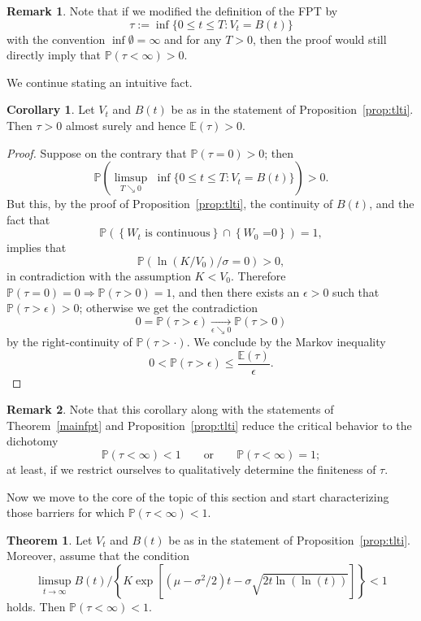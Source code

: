 \documentclass[12pt]{article}
\theoremstyle{definition}
\newtheorem{theorem}{Theorem}
\newtheorem{corollary}{Corollary}[theorem]
\newtheorem{remark}{Remark}[theorem]
\begin{document}
\begin{remark}\label{rem:nfpt}
Note that if we modified the definition of the FPT by
$$
\tau := \inf \{ 0 \le t \le T : V_t = B(t)\}
$$
with the convention $\inf \emptyset = \infty$ and
for any $T >0$, then the proof would still directly imply that $\mathbb{P}(\tau < \infty) >0$.
\end{remark}

We continue stating an intuitive fact.

\begin{corollary}\label{obviousfact}
Let $V_t$ and $B(t)$ be as in the statement of Proposition~\ref{prop:tlti}. Then $\tau >0$ almost surely and hence $\mathbb{E}(\tau)>0$.
\end{corollary}

\begin{proof}
Suppose on the contrary that $\mathbb{P}(\tau=0)>0$; then
$$
\mathbb{P} \left( \limsup_{T \searrow 0} \,\, \inf \{0 \le t \le T : V_t = B(t)\} \right) >0.
$$
But this, by the proof of Proposition~\ref{prop:tlti}, the continuity of $B(t)$, and the fact that
$$
\mathbb{P} \left( \left\{ \text{$W_t$ is continuous} \right\} \cap \left\{ \text{$W_0$ =0} \right\} \right)=1,
$$
implies that
$$
\mathbb{P} \left( \ln(K/V_0) /\sigma =0 \right) >0,
$$
in contradiction with the assumption $K < V_0$. Therefore
$\mathbb{P}(\tau=0)=0 \Rightarrow \mathbb{P}(\tau > 0)=1$, and then there exists an $\epsilon>0$ such that $\mathbb{P}(\tau > \epsilon)>0$; otherwise we get the contradiction
$$
0=\mathbb{P}(\tau > \epsilon) \underset{\epsilon \searrow 0}{\longrightarrow} \mathbb{P}(\tau > 0)
$$
by the right-continuity of $\mathbb{P}(\tau > \cdot)$. We conclude by the Markov inequality
$$
0 < \mathbb{P}(\tau > \epsilon) \le \frac{\mathbb{E}(\tau)}{\epsilon}.
$$
\end{proof}

\begin{remark}\label{rem:dich}
Note that this corollary along with the statements of Theorem~\ref{mainfpt} and Proposition~\ref{prop:tlti} reduce the critical behavior to the dichotomy
$$
\mathbb{P}(\tau < \infty) < 1 \qquad \text{or} \qquad \mathbb{P}(\tau < \infty) = 1;
$$
at least, if we restrict ourselves to qualitatively determine the finiteness of $\tau$.
\end{remark}

Now we move to the core of the topic of this section and start characterizing those barriers for which $\mathbb{P}(\tau < \infty) < 1$.

\begin{theorem}\label{theor:tlti}
Let $V_t$ and $B(t)$ be as in the statement of Proposition~\ref{prop:tlti}. Moreover, assume that the condition
$$
\limsup_{t \to \infty} B(t) \Big/ \left\{ K \exp \left[(\mu-\sigma^2/2)t - \sigma \sqrt{2t \ln(\ln(t))}\right] \right\} < 1
$$
holds. Then $\mathbb{P}(\tau < \infty) < 1$.
\end{theorem}
\end{document}

